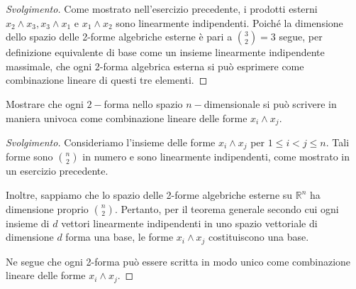\begin{proof}[Svolgimento]
    Come mostrato nell'esercizio precedente, i prodotti esterni \( x_2 \wedge x_3, x_3 \wedge x_1 \) e \( x_1 \wedge x_2 \) sono linearmente indipendenti. Poiché la dimensione dello spazio delle 2-forme algebriche esterne è pari a \( \binom{3}{2} = 3 \) segue, per definizione equivalente di base come un insieme linearmente indipendente massimale, che ogni 2-forma algebrica esterna si può esprimere come combinazione lineare di questi tre elementi.
\end{proof}
\begin{exercise}
    Mostrare che ogni $2-$forma nello spazio $n-$dimensionale si può scrivere in maniera univoca come combinazione lineare delle forme $x_i \wedge x_j$.
\end{exercise}
\begin{proof}[Svolgimento]
    Consideriamo l’insieme delle forme $x_i \wedge x_j$ per $1 \le i < j \le n$. Tali forme sono $ \binom{n}{2} $ in numero e sono linearmente indipendenti, come mostrato in un esercizio precedente.

    Inoltre, sappiamo che lo spazio delle 2-forme algebriche esterne su \( \mathbb{R}^n \) ha dimensione proprio \( \binom{n}{2} \). Pertanto, per il teorema generale secondo cui ogni insieme di \( d \) vettori linearmente indipendenti in uno spazio vettoriale di dimensione \( d \) forma una base, le forme \( x_i \wedge x_j \) costituiscono una base.

    Ne segue che ogni 2-forma può essere scritta in modo unico come combinazione lineare delle forme \( x_i \wedge x_j \).
\end{proof}

